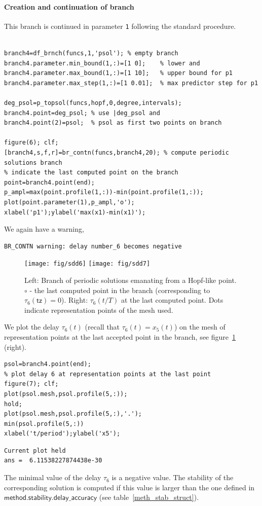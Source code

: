 \documentclass[10pt]{scrartcl}
\newcommand{\parm}[1]{\mathsf{#1}}
\newcommand{\blist}[1]{\mbox{\lstinline!#1!}}
\begin{document}
\paragraph{Creation and continuation of branch}
This branch is continued in parameter \blist{1} following the standard procedure.
\begin{lstlisting}

branch4=df_brnch(funcs,1,'psol'); % empty branch
branch4.parameter.min_bound(1,:)=[1 0];    % lower and
branch4.parameter.max_bound(1,:)=[1 10];   % upper bound for p1
branch4.parameter.max_step(1,:)=[1 0.01];  % max predictor step for p1

deg_psol=p_topsol(funcs,hopf,0,degree,intervals);
branch4.point=deg_psol; % use |deg_psol and
branch4.point(2)=psol;  % psol as first two points on branch

figure(6); clf;
[branch4,s,f,r]=br_contn(funcs,branch4,20); % compute periodic solutions branch
% indicate the last computed point on the branch
point=branch4.point(end);
p_ampl=max(point.profile(1,:))-min(point.profile(1,:));
plot(point.parameter(1),p_ampl,'o');
xlabel('p1');ylabel('max(x1)-min(x1)');
\end{lstlisting}
\noindent We again have a warning,
{\small
\begin{verbatim}
BR_CONTN warning: delay number_6 becomes negative
\end{verbatim}}
  \begin{figure}[h]
    \begin{center}
      \texttt{[image: fig/sdd6]}
      \texttt{[image: fig/sdd7]}
    \end{center}
    \caption{\label{br_ps_sd2}Left: Branch of periodic solutions emanating
      from a Hopf-like point. $\circ$ - the last computed point in the branch
      (corresponding to $\tau_6(\parm{tz})=0$). Right: $\tau_6(t/T)$ at 
      the last computed point. Dots indicate representation points
      of the mesh used.}
  \end{figure}
We plot the delay $\tau_6(t)$ (recall that $\tau_6(t)=x_5(t)$)
on the mesh of representation points at the last accepted point 
in the branch, see figure~\ref{br_ps_sd2} (right).
\begin{lstlisting}
psol=branch4.point(end);
% plot delay 6 at representation points at the last point
figure(7); clf;
plot(psol.mesh,psol.profile(5,:));
hold;
plot(psol.mesh,psol.profile(5,:),'.');
min(psol.profile(5,:))
xlabel('t/period');ylabel('x5');  
\end{lstlisting}
{\small
\begin{verbatim}
Current plot held
ans =  6.11538227874438e-30
\end{verbatim}}
The minimal value of the delay $\tau_6$ is a negative value. 
The stability of the corresponding solution is computed if this 
value is larger 
than the one defined in $\parm{method.stability.delay\_accuracy}$
(see table~\ref{meth_stab_struct}).
\end{document}
